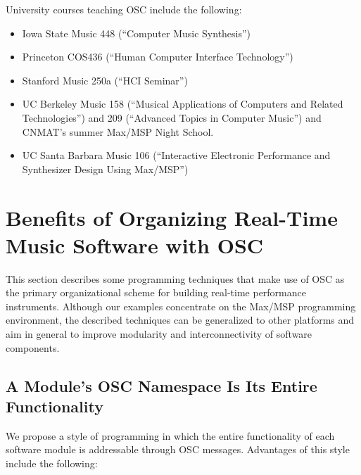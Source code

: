 University courses teaching OSC include the following:

\begin{itemize}
	\item Iowa State Music 448 (``Computer Music Synthesis'')
	\item Princeton COS436 (``Human Computer Interface Technology'')
	\item Stanford Music 250a (``HCI Seminar'')
	\item UC Berkeley Music 158 (``Musical Applications of Computers and Related
Technologies'') and 209 (``Advanced Topics in Computer Music'') and CNMAT's
summer Max/MSP Night School.
	\item UC Santa Barbara Music 106 (``Interactive Electronic Performance and Synthesizer
Design Using Max/MSP'')
\end{itemize}

\section{Benefits of Organizing Real-Time Music Software with OSC}

This section describes some programming techniques that make use of OSC as the
primary organizational scheme for building real-time performance instruments. 
Although our examples concentrate on the Max/MSP programming environment, the
described techniques can be generalized to other platforms and aim in general to
improve modularity and interconnectivity of software components.

\subsection{A Module's OSC Namespace Is Its Entire Functionality}

We propose a style of programming in which the entire functionality of each
software module is addressable through OSC messages. Advantages of this style
include the following:

